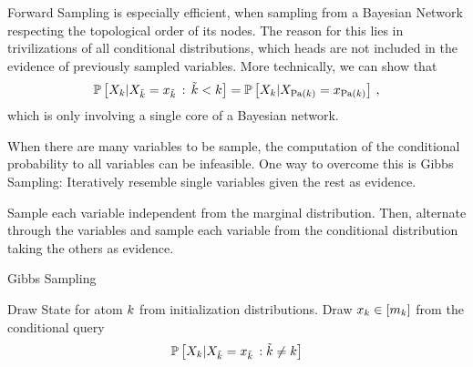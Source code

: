 %
Forward Sampling is especially efficient, when sampling from a Bayesian Network respecting the topological order of its nodes.
The reason for this lies in trivilizations of all conditional distributions, which heads are not included in the evidence of previously sampled variables.
More technically, we can show that
	\[ \mathbb{P}\left[X_{k}|X_{\tilde{k}}=x_{\tilde{k}} \, : \, \tilde{k} < k\right]  
	= \mathbb{P}\left[X_{k}|X_{\mathrm{Pa}(k)}=x_{\mathrm{Pa}(k)}\right] \, , \]
which is only involving a single core of a Bayesian network.




When there are many variables to be sample, the computation of the conditional probability to all variables can be infeasible.
One way to overcome this is Gibbs Sampling: Iteratively resemble single variables given the rest as evidence.


Sample each variable independent from the marginal distribution.
Then, alternate through the variables and sample each variable from the conditional distribution taking the others as evidence.

\begin{algorithm}[hbt!]
\caption{Gibbs Sampling}\label{alg:Gibbs}
\begin{algorithmic}
\For{$\catenumeratorin$}
	\State Draw State for atom $k$ from initialization distributions. %
\EndFor
{}
\For{$\catenumeratorin$}
	\State Draw $x_{k}\in[m_{k}]$ from the conditional query
		\[ \mathbb{P}\left[X_{k}|X_{\tilde{k}}=x_{\tilde{k}}\, : \tilde{k} \neq k\right] \]
\EndFor
\EndWhile
\end{algorithmic}
\end{algorithm}


